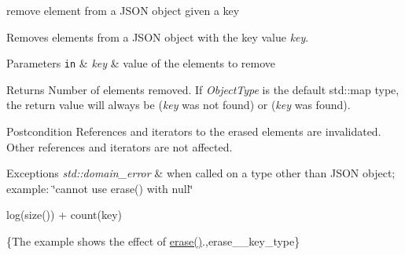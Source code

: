 remove element from a J\-S\-O\-N object given a key 

Removes elements from a J\-S\-O\-N object with the key value {\itshape key}.


\begin{DoxyParams}[1]{Parameters}
\mbox{\tt in}  & {\em key} & value of the elements to remove\\
\hline
\end{DoxyParams}
\begin{DoxyReturn}{Returns}
Number of elements removed. If {\itshape Object\-Type} is the default {\ttfamily std\-::map} type, the return value will always be {} ({\itshape key} was not found) or {} ({\itshape key} was found).
\end{DoxyReturn}
\begin{DoxyPostcond}{Postcondition}
References and iterators to the erased elements are invalidated. Other references and iterators are not affected.
\end{DoxyPostcond}

\begin{DoxyExceptions}{Exceptions}
{\em std\-::domain\-\_\-error} & when called on a type other than J\-S\-O\-N object; example\-: {\ttfamily \char`\"{}cannot use erase() with null\char`\"{}}\\
\hline
\end{DoxyExceptions}
{\ttfamily log(size()) + count(key)}

\{The example shows the effect of {\ttfamily \hyperlink{classnlohmann_1_1basic__json_a45e789042a23138eba2b69f34df9fc45}{erase()}}.,erase\-\_\-\-\_\-key\-\_\-type\}

